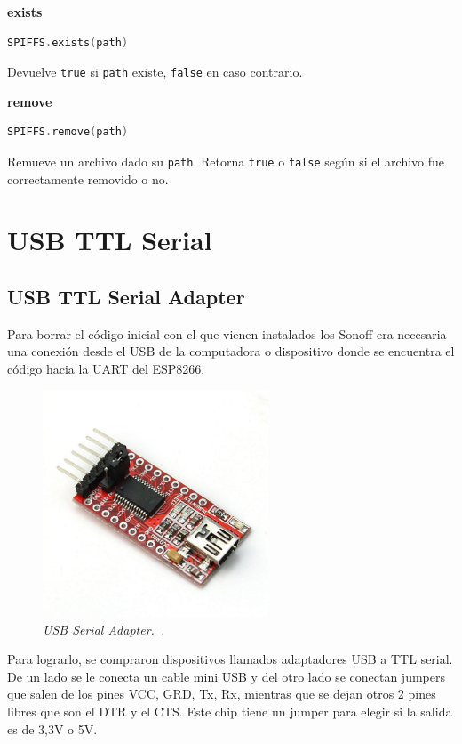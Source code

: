 \textbf{exists}
\begin{lstlisting}[language=C]
SPIFFS.exists(path)
\end{lstlisting}
Devuelve \lstinline[columns=fixed]{true} si \lstinline[columns=fixed]{path} existe, \lstinline[columns=fixed]{false} en caso contrario.

\textbf{remove}
\begin{lstlisting}[language=C]
SPIFFS.remove(path)
\end{lstlisting}
Remueve un archivo dado su \lstinline[columns=fixed]{path}. Retorna \lstinline[columns=fixed]{true} o \lstinline[columns=fixed]{false} según si el archivo fue correctamente removido o no.


\section{USB TTL Serial}

\subsection{USB TTL Serial Adapter}
Para borrar el código inicial con el que vienen instalados los Sonoff era necesaria una conexión desde el USB de la computadora o dispositivo donde se encuentra el código hacia la UART del ESP8266.

\begin{figure}[h!]
  \centering
  \includegraphics[width=0.6\textwidth, keepaspectratio]{images/usb-serial-adapter}
  \caption{\textit{USB Serial Adapter.~\cite{USBSerialAdapter}.}}
  \label{fig:usb-serial-adapter}
\end{figure}

Para lograrlo, se compraron dispositivos llamados adaptadores USB a TTL serial. De un lado se le conecta un cable mini USB y del otro lado se conectan jumpers que salen de los pines VCC, GRD, Tx, Rx, mientras que se dejan otros 2 pines libres que son el DTR y el CTS. Este chip tiene un jumper para elegir si la salida es de 3,3V o 5V.


